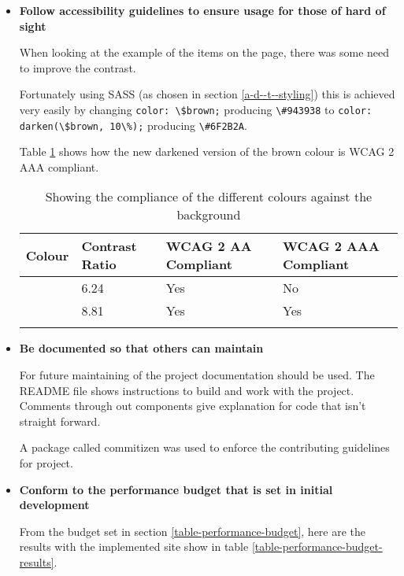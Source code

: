 \begin{itemize}
  \item \textbf{Follow accessibility guidelines to ensure usage for those of hard of sight}

    When looking at the example of the items on the page, there was some need to improve the contrast.

    Fortunately using SASS (as chosen in section \ref{a-d--t--styling}) this is achieved very easily by changing \verb|color: \$brown;| producing \verb|\#943938| to \verb|color: darken(\$brown, 10\%);| producing \verb|\#6F2B2A|.

    Table \ref{table-contrast-changes} shows how the new darkened version of the brown colour is WCAG 2 AAA compliant.

    \begin{table}[H]
    \centering
    \begin{tabular}{|l|l|l|l|}
    \hline
    \textbf{Colour} & \textbf{Contrast Ratio} & \textbf{WCAG 2 AA Compliant} & \textbf{WCAG 2 AAA Compliant} \\ \hline
    \cellcolor[HTML]{943938}{\textbf{\textcolor{white}{\#943938}}} & 6.24 & Yes & No \\ \hline
    \cellcolor[HTML]{6F2B2A}{\textbf{\textcolor{white}{\#6F2B2A}}} & 8.81 & Yes & Yes \\ \hline
    \caption{Showing the compliance of the different colours against the background}
    \label{table-contrast-changes}
    \end{tabular}
    \end{table}

  \item \textbf{Be documented so that others can maintain}

    For future maintaining of the project documentation should be used. The README file shows instructions to build and work with the project. Comments through out components give explanation for code that isn't straight forward.

    A package called commitizen was used to enforce the contributing guidelines for project. \cite{commitizen}

  \item \textbf{Conform to the performance budget that is set in initial development}

    From the budget set in section \ref{table-performance-budget}, here are the results with the implemented site show in table \ref{table-performance-budget-results}.


\end{itemize}
